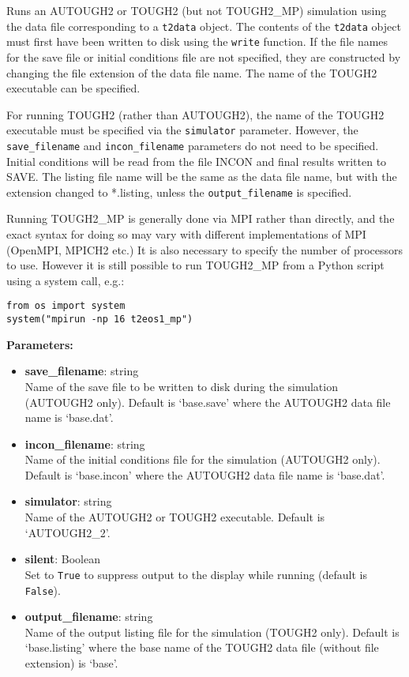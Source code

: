 Runs an AUTOUGH2 or TOUGH2 (but not TOUGH2\_MP) simulation using the data file corresponding to a \texttt{t2data} object.  The contents of the \texttt{t2data} object must first have been written to disk using the \texttt{write} function.  If the file names for the save file or initial conditions file are not specified, they are constructed by changing the file extension of the data file name.  The name of the TOUGH2 executable can be specified.

For running TOUGH2 (rather than AUTOUGH2), the name of the TOUGH2 executable must be specified via the \texttt{simulator} parameter.  However, the \texttt{save\_filename} and \texttt{incon\_filename} parameters do not need to be specified.  Initial conditions will be read from the file INCON and final results written to SAVE.  The listing file name will be the same as the data file name, but with the extension changed to *.listing, unless the \texttt{output\_filename} is specified.

Running TOUGH2\_MP is generally done via MPI rather than directly, and the exact syntax for doing so may vary with different implementations of MPI (OpenMPI, MPICH2 etc.)  It is also necessary to specify the number of processors to use.  However it is still possible to run TOUGH2\_MP from a Python script using a system call, e.g.:

\begin{lstlisting}
from os import system
system("mpirun -np 16 t2eos1_mp")
\end{lstlisting}

\textbf{Parameters:}
\begin{itemize}
\item \textbf{save\_filename}: string\\
  Name of the save file to be written to disk during the simulation (AUTOUGH2 only).  Default is `base.save' where the AUTOUGH2 data file name is `base.dat'.
\item \textbf{incon\_filename}: string\\
  Name of the initial conditions file for the simulation (AUTOUGH2 only).  Default is `base.incon' where the AUTOUGH2 data file name is `base.dat'.
\item \textbf{simulator}: string\\
  Name of the AUTOUGH2 or TOUGH2 executable.  Default is `AUTOUGH2\_2'.
\item \textbf{silent}: Boolean\\
  Set to \texttt{True} to suppress output to the display while running (default is \texttt{False}).
\item \textbf{output\_filename}: string\\
  Name of the output listing file for the simulation (TOUGH2 only).  Default is `base.listing' where the base name of the TOUGH2 data file (without file extension) is `base'.
\end{itemize}

